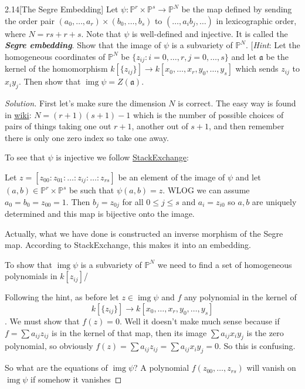 \begin{manualexercise}{2.14}[The Segre Embedding]
	Let $\psi:\mathbb{P}^r\times\mathbb{P}^s\to\mathbb{P}^N$ be the map defined by sending the order pair $(a_0,\ldots,a_r)\times(b_0,\ldots,b_s)$ to $(\ldots,a_ib_j,\ldots)$ in lexicographic order, where $N=rs+r+s$. Note that $\psi$ is well-defined and injective. It is called the \textbf{\textit{Segre embedding}}. Show that the image of $\psi$ is a subvariety of $\mathbb{P}^N$. [\textit{Hint}: Let the homogeneous coordinates of $\mathbb{P}^N$ be $\{z_{ij}:i=0,\ldots,r,j=0,\ldots,s\}$ and let $\mathfrak{a}$ be the kernel of the homomorphism $k[\{z_{ij}\}]\to k[x_0,\ldots,x_r,y_0,\ldots,y_s]$ which sends $z_{ij}$ to $x_iy_j$. Then show that $\operatorname{img}\psi=Z(\mathfrak{a})$.
\end{manualexercise}

\begin{proof}[Solution]
	First let's make sure the dimension $N$ is correct. The easy way is found in \href{https://en.wikipedia.org/wiki/Segre_embedding}{wiki}: $N=(r+1)(s+1)-1$ which is the number of possible choices of pairs of things taking one out $r+1$, another out of $s+1$, and then remember there is only one zero index so take one away.
	
	To see that $\psi$ is injective we follow \href{https://math.stackexchange.com/questions/3683364/segre-map-is-an-embedding}{StackExchange}: 
	{\color{azure}Let $z=[z_{00}:z_{01}:\ldots:z_{ij}:\ldots:z_{rs}]$ be an element of the image of $\psi$ and let $(a,b)\in\mathbb{P}^r\times\mathbb{P}^s$ be such that $\psi(a,b)=z$. WLOG we can assume $a_0=b_0=z_{00}=1$. Then $b_j=z_{0j}$ for all $0\leq j\leq s$ and $a_i=z_{i0}$ so $a,b$ are uniquely determined and this map is bijective onto the image.
	
	Actually, what we have done is constructed an inverse morphism of the Segre map. According to StackExchange, this makes it into an embedding.}
	
	To show that $\operatorname{img}\psi$ is a subvariety of $\mathbb{P}^N$ we need to find a set of homogeneous polynomials in $k[z_{ij}]$/
	
	Following the hint, as before let $z\in\operatorname{img}\psi$ and $f$ any polynomial in the kernel of \[k[\{z_{ij}\}]\to k[x_0,\ldots,x_r,y_0,\ldots,y_s]\]. We must show that $f(z)=0$. Well it doesn't make much sense because if $f=\sum a_{ij}z_{ij}$ is in the kernel of that map, then its image $\sum a_{ij}x_iy_j$ is the zero polynomial, so obviously $f(z)=\sum a_{ij}z_{ij}=\sum a_{ij}x_iy_j=0$. So this is confusing.
	
	So what are the equations of $\operatorname{img}\psi$? A polynomial $f(z_{00},\ldots,z_{rs})$ will vanish on $\operatorname{img}\psi$ if somehow it vanishes 
\end{proof}




